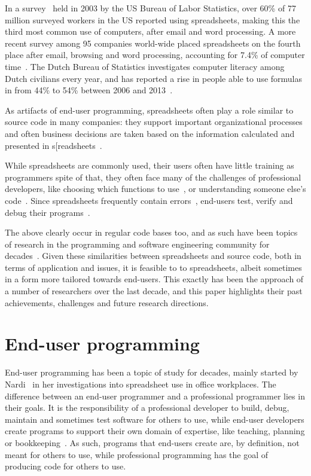 \documentclass[conference]{IEEEtran}
\begin{document}
In a survey~\cite{BLS2003} held in 2003 by the US Bureau of Labor Statistics, over 60\% of 77 million surveyed workers in the US reported using spreadsheets, making this the third most common use of computers, after email and word processing. A more recent survey among 95 companies world-wide placed spreadsheets on the fourth place after email, browsing and word processing, accounting for 7.4\% of computer time~\cite{Wellnomics2007}. The Dutch Bureau of Statistics investigates computer literacy among Dutch civilians every year, and has reported a rise in people able to use formulas in  from 44\% to 54\% between 2006 and 2013~\cite{CBS2013}.

As artifacts of end-user programming, spreadsheets often play a role similar to source code in many companies: they support important organizational processes and often business decisions are taken based on the information calculated and presented in s[readsheets~\cite{hermans_supporting_2011}.

While spreadsheets are commonly used, their users often have little training as programmers  spite of that, they often face many of the challenges of professional developers, like choosing which functions to use~\cite{Ko2004}, or understanding someone else's code~\cite{Ko2011}. Since spreadsheets frequently contain errors~\cite{Panko1998}, end-users test, verify and debug their programs~\cite{Hermans2013-Cascon,Ko2004-Why}.

The above  clearly occur in regular code bases too, and as such have been topics of research in the programming and software engineering community for decades~\cite{Ko2011}. Given these similarities between spreadsheets and source code, both in terms of application and issues, it is feasible to  to spreadsheets, albeit sometimes in a form more tailored towards end-users. This exactly has been the approach of a number of researchers over the last decade, and this paper highlights their past achievements, challenges and future research directions. 


\section{End-user programming}
End-user programming has been a topic of study for decades, mainly started by Nardi~\cite{Nardi1993} in her investigations into spreadsheet use in office workplaces. The difference between an end-user programmer and a professional programmer lies in their goals. It is the responsibility of a professional developer to build, debug, maintain and sometimes test software for others to use, while end-user developers create programs to support their own domain of expertise, like teaching, planning or bookkeeping~\cite{Ko2011}. As such, programs that end-users create are, by definition, not meant for others to use, while professional programming has the goal of producing code for others to use. 
\end{document}
